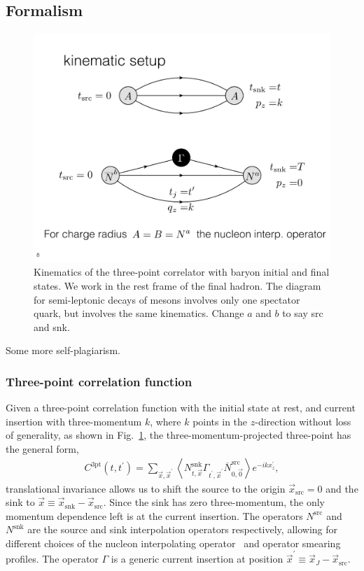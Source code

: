 \documentclass[prd,aps,twocolumn,superscriptaddress,tightenlines,nofootinbib,floatfix,preprintnumbers,10pt]{revtex4-1}
\begin{document}
\subsection{Formalism}
\begin{figure}[t]
	\centering
	\includegraphics[width=\columnwidth]{./cropped_kinematics.pdf}
	\caption{Kinematics of the three-point correlator with baryon initial and final states. We work in the rest frame of the final hadron. The diagram for semi-leptonic decays of mesons involves only one spectator quark, but involves the same kinematics. {\color{red} Change $a$ and $b$ to say src and snk.}}
	\label{fig:3pt_kinematics}
\end{figure}
{\color{red} Some more self-plagiarism.}
\subsubsection{Three-point correlation function}
Given a three-point correlation function with the initial state at rest, and current insertion with three-momentum $k$, where $k$ points in the $z$-direction without loss of generality, as shown in Fig.~\ref{fig:3pt_kinematics}, the three-momentum-projected three-point has the general form,
\begin{align}
C^{\text{3pt}}(t, t^\prime) = \sum_{\vec{x},\vec{x}^\prime} \left<N^{\mathrm{snk}}_{t,\vec{x}}\Gamma_{t^\prime,\vec{x}^\prime} \overline{N}^{\mathrm{src}}_{0,\vec{0}}\right> e^{-ikx^\prime_z},
\label{eq:3pt}
\end{align}
translational invariance allows us to shift the source to the origin
$\vec{x}_{\mathrm{src}} = 0$ and the sink to $\vec{x}\equiv
\vec{x}_{\mathrm{snk}} - \vec{x}_{\mathrm{src}}$. Since the sink has
zero three-momentum, the only momentum dependence left is at the
current insertion. The operators $N^{\mathrm{src}}$ and
$N^{\mathrm{snk}}$ are the source and sink interpolation operators
respectively, allowing for different choices of the nucleon
interpolating operator~\cite{Basak:2005ir,Basak:2007kj} and operator
smearing profiles. The operator $\Gamma$ is a generic current
insertion at position $\vec{x}^\prime\equiv
\vec{x}_J-\vec{x}_{\text{src}}$.
\end{document}
